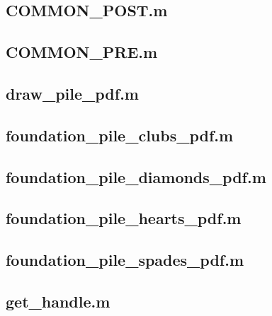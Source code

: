 \documentclass[runningheads,a4paper]{llncs}
\newcommand{\GPenSIM}{../GPenSIM}
\begin{document}
\subsection{COMMON\_POST.m}
\label{app:COMMON_POST}


\subsection{COMMON\_PRE.m}
\label{app:COMMON_PRE}


\subsection{draw\_pile\_pdf.m}
\label{app:draw_pile_pdf}


\subsection{foundation\_pile\_clubs\_pdf.m}
\label{app:foundation_pile_clubs_pdf}


\subsection{foundation\_pile\_diamonds\_pdf.m}
\label{app:foundation_pile_diamonds_pdf}


\subsection{foundation\_pile\_hearts\_pdf.m}
\label{app:foundation_pile_hearts_pdf}


\subsection{foundation\_pile\_spades\_pdf.m}
\label{app:foundation_pile_spades_pdf}


\subsection{get\_handle.m}
\label{app:get_handle}

\end{document}
